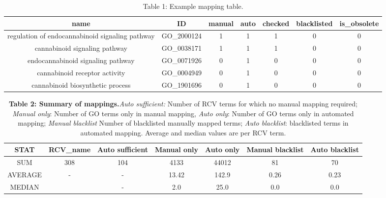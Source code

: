 \documentclass[runningheads,a4paper]{llncs}
\begin{document}
{{\begin{table}
 \caption{Table 1: Example mapping table.}
      \begin{tabular} {| c |  c |  c |  c |  c |  c  | c |}
        \hline
        \textbf{name}&\textbf{ID}&\textbf{manual}&\textbf{auto}&\textbf{checked}&\textbf{blacklisted}&\textbf{is\_obsolete} \\ \hline 
        regulation of endocannabinoid signaling pathway&GO\_2000124&1&1&1&0&0 \\ \hline
        cannabinoid signaling pathway&GO\_0038171&1&1&1&0&0 \\ \hline
        endocannabinoid signaling pathway&GO\_0071926&0&1&0&0&0 \\ \hline
        cannabinoid receptor activity&GO\_0004949&0&1&0&0&0 \\ \hline
        cannabinoid biosynthetic process&GO\_1901696&0&1&0&0&0 \\ \hline
        \end{tabular}
 \end{table}


\begin{table}
 \caption{\textbf{Table 2: Summary of mappings.}\textit{Auto sufficient:} Number of RCV terms for which no manual mapping required; \textit{Manual only}: Number of GO terms only in manual mapping,  \textit{Auto only}: Number of GO terms only in automated mapping; \textit{Manual blacklist} Number of blacklisted manually mapped terms; \textit{Auto blacklist}: blacklisted terms in automated mapping. Average and median values are per RCV term.}
\begin{tabular}  {| c |  c |  c |  c |  c |  c  | c |}
\hline
STAT&RCV\_name&Auto sufficient&Manual only&Auto only&Manual blacklist&Auto blacklist \\ \hline
SUM&308&104&4133&44012&81&70 \\ \hline
AVERAGE&-&-&13.42&142.9&0.26&0.23 \\ \hline
MEDIAN&&-&2.0&25.0&0.0&0.0 \\ \hline
\end{tabular}
 \end{table}
 

}}
\end{document}
